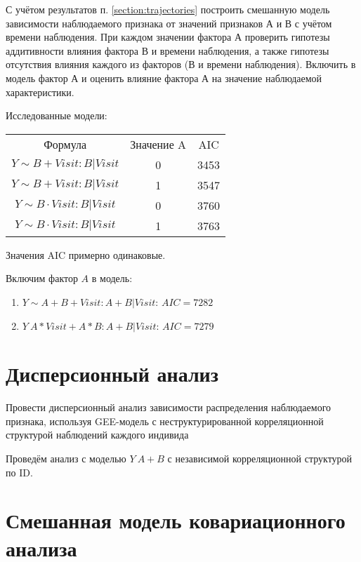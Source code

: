 \documentclass[a4paper,12pt]{article}
\begin{document}
\begin{leftbar}
С учётом результатов п. \ref{section:trajectories} построить смешанную модель зависимости наблюдаемого признака от значений признаков А и В с учётом времени наблюдения.
При каждом значении фактора А проверить гипотезы аддитивности влияния фактора В и времени наблюдения, а также гипотезы отсутствия влияния каждого из факторов (В и времени наблюдения).
Включить в модель фактор А и оценить влияние фактора А на значение наблюдаемой характеристики.
\end{leftbar}

Исследованные модели:

\begin{tabular}{ccc}
	Формула & Значение A & AIC \\
	$ Y \sim B + Visit : B | Visit $  & 0 & 3453 \\
	$ Y \sim B + Visit : B | Visit $  & 1 & 3547 \\
	$ Y \sim B \cdot Visit : B | Visit $ & 0 & 3760 \\
	$ Y \sim B \cdot Visit : B | Visit $ & 1 & 3763 \\
\end{tabular}

Значения AIC примерно одинаковые.

Включим фактор $ A $ в модель:

\begin{enumerate}[noitemsep]
	\item $ Y \sim  A + B + Visit: A + B | Visit $: $ AIC = 7282 $
	\item $ Y ~ A * Visit + A * B : A + B | Visit $: $ AIC = 7279 $
\end{enumerate}

\section{ Дисперсионный анализ }
\label{section:anova}

\begin{leftbar}
Провести дисперсионный анализ зависимости распределения наблюдаемого признака, используя GEE-модель с неструктурированной корреляционной структурой наблюдений каждого индивида
\end{leftbar}

Проведём анализ с моделью $ Y ~ A + B $ с независимой корреляционной структурой по ID.


\section{ Смешанная модель ковариационного анализа }
\end{document}
